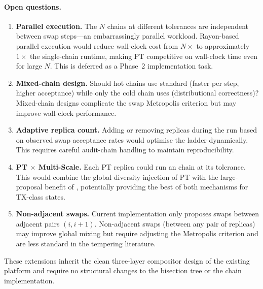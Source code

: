 \paragraph{Open questions.}
\begin{enumerate}
\item \textbf{Parallel execution.}
  The $N$ chains at different tolerances are independent between swap steps---an
  embarrassingly parallel workload.
  Rayon-based parallel execution would reduce wall-clock cost from $N\times$
  to approximately $1\times$ the single-chain runtime, making PT competitive
  on wall-clock time even for large $N$.
  This is deferred as a Phase~2 implementation task.
\item \textbf{Mixed-chain design.}
  Should hot chains use standard \recom{} (faster per step, higher acceptance)
  while only the cold chain uses \fr{} (distributional correctness)?
  Mixed-chain designs complicate the swap Metropolis criterion but may improve
  wall-clock performance.
\item \textbf{Adaptive replica count.}
  Adding or removing replicas during the run based on observed swap acceptance
  rates would optimise the ladder dynamically.
  This requires careful audit-chain handling to maintain reproducibility.
\item \textbf{PT $\times$ Multi-Scale.}
  Each PT replica could run an \ms{} chain at its tolerance.
  This would combine the global diversity injection of PT with the large-proposal
  benefit of \ms{}, potentially providing the best of both mechanisms for
  TX-class states.
\item \textbf{Non-adjacent swaps.}
  Current implementation only proposes swaps between adjacent pairs $(i, i+1)$.
  Non-adjacent swaps (between any pair of replicas) may improve global mixing
  but require adjusting the Metropolis criterion and are less standard in the
  tempering literature.
\end{enumerate}

These extensions inherit the clean three-layer compositor design of the existing
platform and require no structural changes to the bisection tree or the
\fr{} chain implementation.
